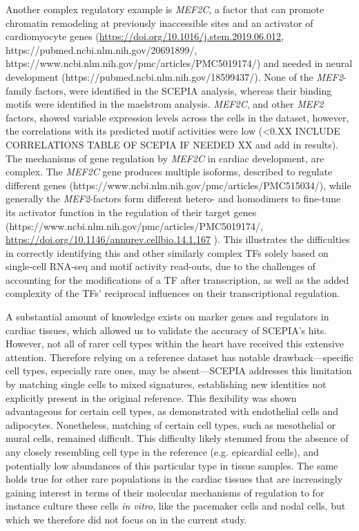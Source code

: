 Another complex regulatory example is \textit{MEF2C}, a factor that can promote chromatin remodeling at previously inaccessible sites and an activator of cardiomyocyte genes (\href{https://doi.org/10.1016/j.stem.2019.06.012}{https://doi.org/10.1016/j.stem.2019.06.012}, https://pubmed.ncbi.nlm.nih.gov/20691899/, https://www.ncbi.nlm.nih.gov/pmc/articles/PMC5019174/) and needed in neural development (https://pubmed.ncbi.nlm.nih.gov/18599437/). None of the \textit{MEF2}-family factors, were identified in the SCEPIA analysis, whereas their binding motifs were identified in the maelstrom analysis. \textit{MEF2C}, and other \textit{MEF2} factors, showed variable expression levels across the cells in the dataset, however, the correlations with its predicted motif activities were low (<0.XX INCLUDE CORRELATIONS TABLE OF SCEPIA IF NEEDED XX and add in results). The mechanisms of gene regulation by \textit{MEF2C} in cardiac development, are complex. The \textit{MEF2C} gene produces multiple isoforms, described to regulate different genes (https://www.ncbi.nlm.nih.gov/pmc/articles/PMC515034/), while generally the \textit{MEF2}-factors form different hetero- and homodimers to fine-tune its activator function in the regulation of their target genes (https://www.ncbi.nlm.nih.gov/pmc/articles/PMC5019174/, \href{https://doi.org/10.1146/annurev.cellbio.14.1.167}{https://doi.org/10.1146/annurev.cellbio.14.1.167} ). This illustrates the difficulties in correctly identifying this and other similarly complex TFs solely based on single-cell RNA-seq and motif activity read-outs, due to the challenges of accounting for the modifications of a TF after transcription, as well as the added complexity of the TFs' reciprocal influences on their transcriptional regulation. %

A substantial amount of knowledge exists on marker genes and regulators in cardiac tissues, which allowed us to validate the accuracy of SCEPIA's hits. However, not all of rarer cell types within the heart have received this extensive attention. Therefore relying on a reference dataset has notable drawback—specific cell types, especially rare ones, may be absent—SCEPIA addresses this limitation by matching single cells to mixed signatures, establishing new identities not explicitly present in the original reference. This flexibility was shown advantageous for certain cell types, as demonstrated with endothelial cells and adipocytes. Nonetheless, matching of certain cell types, such as mesothelial or mural cells, remained difficult. This difficulty likely stemmed from the absence of any closely resembling cell type in the reference (e.g. epicardial cells), and potentially low abundances of this particular type in tissue samples. The same holds true for other rare populations in the cardiac tissues that are increasingly gaining interest in terms of their molecular mechanisms of regulation to for instance culture these cells \textit{in vitro}, like the pacemaker cells and nodal cells, but which we therefore did not focus on in the current study.

